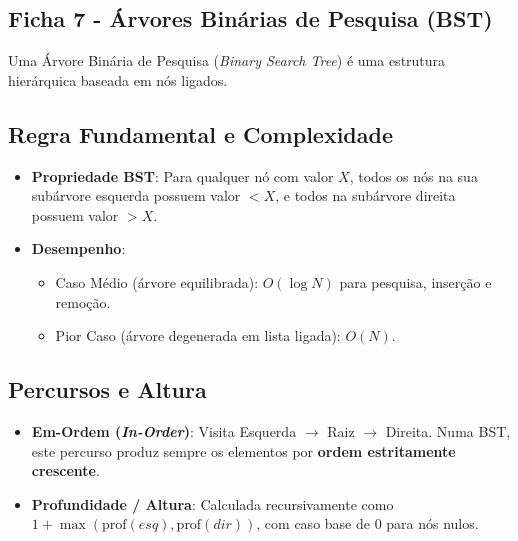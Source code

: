 \documentclass[12pt,a4paper]{article}
\begin{document}
\begin{enumerate}
\section{Ficha 7 - Árvores Binárias de Pesquisa (BST)}
Uma Árvore Binária de Pesquisa (\textit{Binary Search Tree}) é uma estrutura hierárquica baseada em nós ligados.

\subsection*{Regra Fundamental e Complexidade}
\begin{itemize}
    \item \textbf{Propriedade BST}: Para qualquer nó com valor $X$, todos os nós na sua subárvore esquerda possuem valor $< X$, e todos na subárvore direita possuem valor $> X$.
    \item \textbf{Desempenho}:
    \begin{itemize}
        \item Caso Médio (árvore equilibrada): $O(\log N)$ para pesquisa, inserção e remoção.
        \item Pior Caso (árvore degenerada em lista ligada): $O(N)$.
    \end{itemize}
\end{itemize}

\subsection*{Percursos e Altura}
\begin{itemize}
    \item \textbf{Em-Ordem (\textit{In-Order})}: Visita Esquerda $\rightarrow$ Raiz $\rightarrow$ Direita. Numa BST, este percurso produz sempre os elementos por \textbf{ordem estritamente crescente}.
    \item \textbf{Profundidade / Altura}: Calculada recursivamente como $1 + \max(\text{prof}(esq), \text{prof}(dir))$, com caso base de 0 para nós nulos.
\end{itemize}


\end{enumerate}
\end{document}

